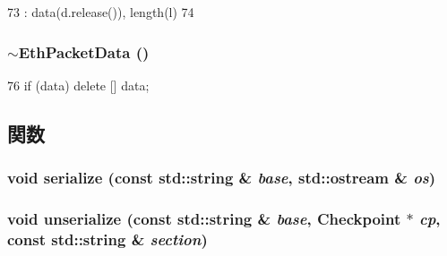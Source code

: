 \begin{DoxyCode}
73         : data(d.release()), length(l)
74     { }
\end{DoxyCode}
\hypertarget{classEthPacketData_a42d7ba93f45b5a9e6f858c3beeff9743}{
\subsubsection[{$\sim$EthPacketData}]{\setlength{\rightskip}{0pt plus 5cm}$\sim${\bf EthPacketData} ()}}
\label{classEthPacketData_a42d7ba93f45b5a9e6f858c3beeff9743}



\begin{DoxyCode}
76 { if (data) delete [] data; }
\end{DoxyCode}


\subsection{関数}
\hypertarget{classEthPacketData_ab4138b21b48e3371a8e20df72b675a88}{
\subsubsection[{serialize}]{\setlength{\rightskip}{0pt plus 5cm}void serialize (const std::string \& {\em base}, \/  std::ostream \& {\em os})}}
\label{classEthPacketData_ab4138b21b48e3371a8e20df72b675a88}
\hypertarget{classEthPacketData_a147c320e3d6506edf5587a40cd8e430d}{
\subsubsection[{unserialize}]{\setlength{\rightskip}{0pt plus 5cm}void unserialize (const std::string \& {\em base}, \/  {\bf Checkpoint} $\ast$ {\em cp}, \/  const std::string \& {\em section})}}
\label{classEthPacketData_a147c320e3d6506edf5587a40cd8e430d}


